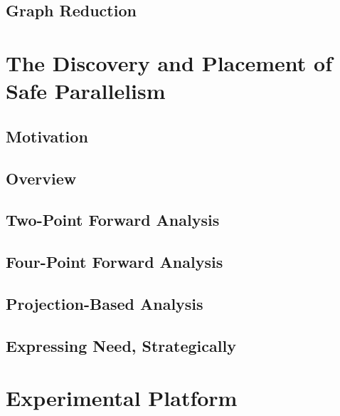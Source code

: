 \documentclass[justified, twoside, a4paper, symmetric]{tufte-book}
\begin{document}
    \section{Graph Reduction}
    

\chapter{The Discovery and Placement of Safe Parallelism}

    

    \section{Motivation}
    

    \section{Overview}
    

    \section{Two-Point Forward Analysis}
    \label{sec:twoPoint}

    \section{Four-Point Forward Analysis}
    \label{sec:fourPoint}

    \section{Projection-Based Analysis}
    \label{sec:projections}
    


    \section{Expressing Need, Strategically}
    \label{sec:derivations}
    
    
\chapter{Experimental Platform}

    
\end{document}
